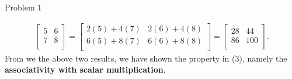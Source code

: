 \begin{problem}{Problem 1}
\begin{Highlight}[Solution]
\begin{align*}
            \begin{bmatrix}
                5 & 6 \\
                7 & 8 \\
            \end{bmatrix}
            = 
            \begin{bmatrix}
                2(5) + 4(7) & 2(6) + 4(8) \\
                6(5) + 8(7) & 6(6) + 8(8) \\
            \end{bmatrix}
            = 
            \begin{bmatrix}
                28 & 44 \\
                86 & 100 \\
            \end{bmatrix}.
        \end{align*}
        From we the above two results, we have shown the property in (3), namely the \textbf{associativity with scalar multiplication}.


\end{Highlight}
\end{problem}
